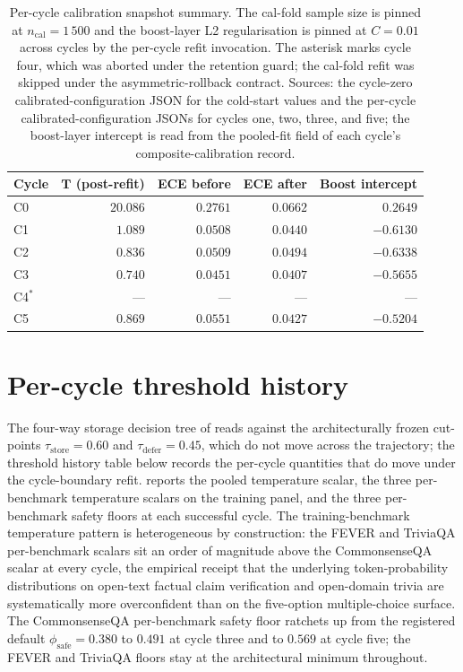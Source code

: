 \begin{table}[!htbp]
\centering\footnotesize
\setlength{\tabcolsep}{6pt}
\renewcommand{\arraystretch}{1.1}
\begin{tabular}{@{}lrrrr@{}}
\toprule
\textbf{Cycle} & $\boldsymbol{T}$ \textbf{(post-refit)} & \textbf{ECE before} & \textbf{ECE after} & \textbf{Boost intercept} \\
\midrule
C0 & $20.086$ & $0.2761$ & $0.0662$ & $\phantom{-}0.2649$ \\
C1 & $1.089$  & $0.0508$ & $0.0440$ & $-0.6130$ \\
C2 & $0.836$  & $0.0509$ & $0.0494$ & $-0.6338$ \\
C3 & $0.740$  & $0.0451$ & $0.0407$ & $-0.5655$ \\
C4$^{\ast}$ & --- & --- & --- & --- \\
C5 & $0.869$  & $0.0551$ & $0.0427$ & $-0.5204$ \\
\bottomrule
\end{tabular}
\caption[Per-cycle calibration snapshot summary]{Per-cycle calibration snapshot summary. The cal-fold sample size is pinned at $n_{\text{cal}} = 1\,500$ and the boost-layer L2 regularisation is pinned at $C = 0.01$ across cycles by the per-cycle refit invocation. The asterisk marks cycle four, which was aborted under the retention guard; the cal-fold refit was skipped under the asymmetric-rollback contract. Sources: the cycle-zero calibrated-configuration JSON for the cold-start values and the per-cycle calibrated-configuration JSONs for cycles one, two, three, and five; the boost-layer intercept is read from the pooled-fit field of each cycle's composite-calibration record.}
\label{tab:app-per-cycle-cal}
\end{table}

\section{Per-cycle threshold history}
\label{app:per-cycle-tau}

The four-way storage decision tree of  reads against the architecturally frozen cut-points $\tau_{\text{store}} = 0.60$ and $\tau_{\text{defer}} = 0.45$, which do not move across the trajectory; the threshold history table below records the per-cycle quantities that do move under the cycle-boundary refit.  reports the pooled temperature scalar, the three per-benchmark temperature scalars on the training panel, and the three per-benchmark safety floors at each successful cycle. The training-benchmark temperature pattern is heterogeneous by construction: the FEVER and TriviaQA per-benchmark scalars sit an order of magnitude above the CommonsenseQA scalar at every cycle, the empirical receipt that the underlying token-probability distributions on open-text factual claim verification and open-domain trivia are systematically more overconfident than on the five-option multiple-choice surface. The CommonsenseQA per-benchmark safety floor ratchets up from the registered default $\phi_{\text{safe}} = 0.380$ to $0.491$ at cycle three and to $0.569$ at cycle five; the FEVER and TriviaQA floors stay at the architectural minimum throughout.

